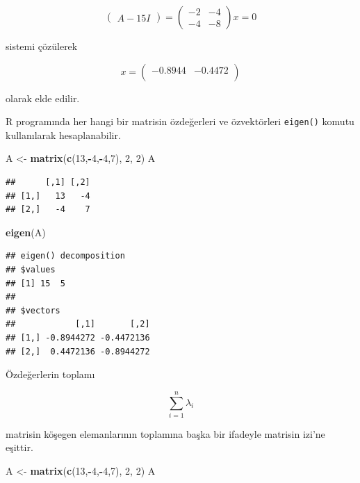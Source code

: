 \documentclass[
]{book}
\newenvironment{Shaded}{\begin{snugshade}}{\end{snugshade}}
\newcommand{\DecValTok}[1]{\textcolor[rgb]{0.00,0.00,0.81}{#1}}
\newcommand{\FunctionTok}[1]{\textcolor[rgb]{0.13,0.29,0.53}{\textbf{#1}}}
\newcommand{\NormalTok}[1]{#1}
\newcommand{\OtherTok}[1]{\textcolor[rgb]{0.56,0.35,0.01}{#1}}
\newcommand{\SpecialCharTok}[1]{\textcolor[rgb]{0.81,0.36,0.00}{\textbf{#1}}}
\begin{document}
\[\begin{pmatrix}
 A-15 I 
\end{pmatrix}
= 
\begin{pmatrix}
 -2 & -4 \\
 -4 & -8 
\end{pmatrix}x 
=0\]

sistemi çözülerek

\[x = 
\begin{pmatrix}
 -0.8944 & -0.4472 \\
\end{pmatrix}\]

olarak elde edilir.

R programında her hangi bir matrisin özdeğerleri ve özvektörleri \texttt{eigen()} komutu kullanılarak hesaplanabilir.

\begin{Shaded}
\begin{Highlighting}[]
\NormalTok{ A }\OtherTok{\textless{}{-}} \FunctionTok{matrix}\NormalTok{(}\FunctionTok{c}\NormalTok{(}\DecValTok{13}\NormalTok{,}\SpecialCharTok{{-}}\DecValTok{4}\NormalTok{,}\SpecialCharTok{{-}}\DecValTok{4}\NormalTok{,}\DecValTok{7}\NormalTok{), }\DecValTok{2}\NormalTok{, }\DecValTok{2}\NormalTok{) }
\NormalTok{ A }
\end{Highlighting}
\end{Shaded}

\begin{verbatim}
##      [,1] [,2]
## [1,]   13   -4
## [2,]   -4    7
\end{verbatim}

\begin{Shaded}
\begin{Highlighting}[]
 \FunctionTok{eigen}\NormalTok{(A) }
\end{Highlighting}
\end{Shaded}

\begin{verbatim}
## eigen() decomposition
## $values
## [1] 15  5
## 
## $vectors
##            [,1]       [,2]
## [1,] -0.8944272 -0.4472136
## [2,]  0.4472136 -0.8944272
\end{verbatim}

Özdeğerlerin toplamı

\[\sum_{i=1}^{n}\lambda_i\]

matrisin köşegen elemanlarının toplamına başka bir ifadeyle matrisin izi'ne eşittir.

\begin{Shaded}
\begin{Highlighting}[]
\NormalTok{ A }\OtherTok{\textless{}{-}} \FunctionTok{matrix}\NormalTok{(}\FunctionTok{c}\NormalTok{(}\DecValTok{13}\NormalTok{,}\SpecialCharTok{{-}}\DecValTok{4}\NormalTok{,}\SpecialCharTok{{-}}\DecValTok{4}\NormalTok{,}\DecValTok{7}\NormalTok{), }\DecValTok{2}\NormalTok{, }\DecValTok{2}\NormalTok{) }
\NormalTok{ A }
\end{Highlighting}
\end{Shaded}
\end{document}
